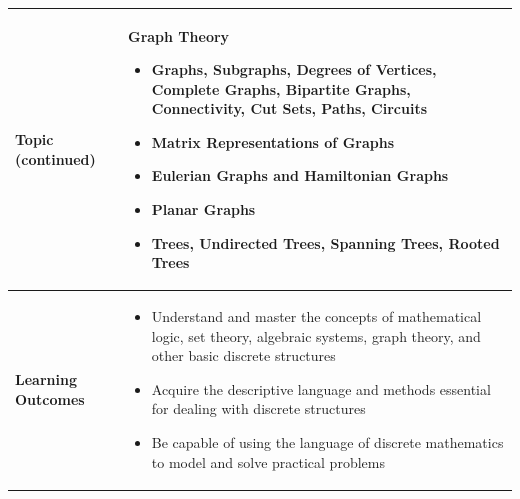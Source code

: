 \documentclass{article}
\begin{document}
\begin{longtable}{|p{3cm}|p{10cm}|}
\hline
\textbf{Topic (continued)} &
Graph Theory
\begin{itemize}
    \item Graphs, Subgraphs, Degrees of Vertices, Complete Graphs, Bipartite Graphs, Connectivity, Cut Sets, Paths, Circuits
    \item Matrix Representations of Graphs
    \item Eulerian Graphs and Hamiltonian Graphs
    \item Planar Graphs
    \item Trees, Undirected Trees, Spanning Trees, Rooted Trees
\end{itemize} \\
\hline
\textbf{Learning Outcomes} & 
    \begin{itemize}
        \item Understand and master the concepts of mathematical logic, set theory, algebraic systems, graph theory, and other basic discrete structures
        \item Acquire the descriptive language and methods essential for dealing with discrete structures
        \item Be capable of using the language of discrete mathematics to model and solve practical problems
    \end{itemize} \\
\hline
\end{longtable}
\end{document}
